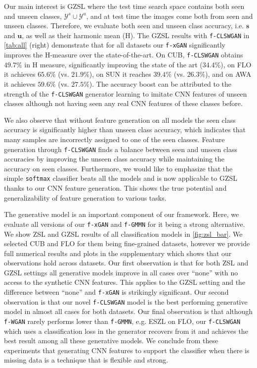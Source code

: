 \documentclass[10pt,twocolumn,letterpaper]{article}
\newcommand{\myparagraph}[1]{\vspace{6pt}\noindent{\bf #1}}
\def\mthd{\texttt{f-xGAN}\xspace}
\begin{document}
\myparagraph{GZSL with \texttt{f-CLSWGAN}.} Our main interest is GZSL where the test time search space contains both seen and unseen classes, $\mathcal{Y}^{s} \cup \mathcal{Y}^{u}$, and at test time the images come both from seen and unseen classes. Therefore, we evaluate both seen and unseen class accuracy, i.e. $\mathbf{s}$ and $\mathbf{u}$, as well as their harmonic mean (H). The GZSL results with \texttt{f-CLSWGAN} in \autoref{tab:all} (right) demonstrate that for all datasets our \mthd significantly improves the H-measure over the state-of-the-art. On CUB, \texttt{f-CLSWGAN} obtains $49.7\%$ in H measure, significantly improving the state of the art ($34.4\%$), on FLO it achieves $65.6\%$ (vs. $21.9\%$), on SUN it reaches $39.4\%$ (vs. $26.3\%$),
and on AWA it achieves $59.6\%$ (vs. $27.5\%$).
The accuracy boost can be attributed to the strength of the \texttt{f-CLSWGAN} generator learning to imitate CNN features of unseen classes although not having seen any real CNN features of these classes before. 

We also observe that without feature generation on all models the seen class accuracy is significantly higher than unseen class accuracy, which indicates that many samples are incorrectly assigned to one of the seen classes. Feature generation through \texttt{f-CLSWGAN} finds a balance between seen and unseen class accuracies by improving the unseen class accuracy while maintaining the accuracy on seen classes. Furthermore, we would like to emphasize that the simple \texttt{softmax} classifier beats all the models and is now applicable to GZSL thanks to our CNN feature generation. This shows the true potential and generalizability of feature generation to various tasks. 


\myparagraph{ZSL and GZSL with \mthd.} The generative model is an important component of our framework. Here, we evaluate all versions of our \mthd and \texttt{f-GMMN} for it being a strong alternative. We show ZSL and GZSL results of all classification models in \autoref{fig:zsl_bar}. We selected CUB and FLO for them being fine-grained datasets, however we provide full numerical results and plots in the supplementary which shows that our observations hold across datasets. Our first observation is that for both ZSL and GZSL settings all generative models improve in all cases over ``none'' with no access to the synthetic CNN features. This applies to the GZSL setting and the difference between ``none'' and \mthd is strikingly significant. Our second observation is that our novel \texttt{f-CLSWGAN} model is the best performing generative model in almost all cases for both datasets. Our final observation is that although \texttt{f-WGAN} rarely performs lower than \texttt{f-GMMN}, e.g. ESZL on FLO, our \texttt{f-CLSWGAN} which uses a classification loss in the generator recovers from it and achieves the best result among all these generative models. We conclude from these experiments that generating CNN features to support the classifier when there is missing data is a technique that is flexible and strong.
\end{document}
